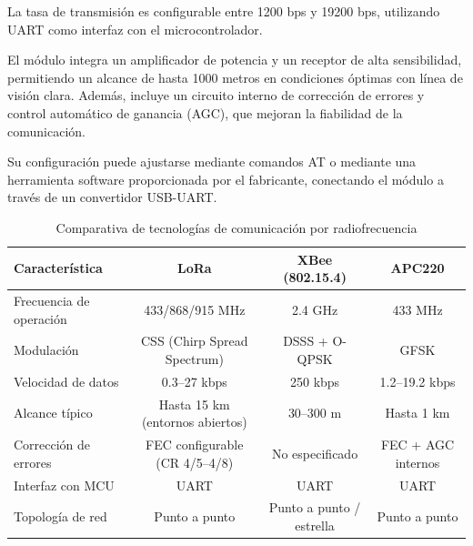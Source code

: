 \begin{itemize}
    La tasa de transmisión es configurable entre 1200 bps y 19200 bps, utilizando UART como interfaz con el microcontrolador.

    El módulo integra un amplificador de potencia y un receptor de alta sensibilidad, permitiendo un alcance de hasta 1000 metros en condiciones óptimas con línea de visión clara.
    Además, incluye un circuito interno de corrección de errores y control automático de ganancia (AGC), que mejoran la fiabilidad de la comunicación.

    Su configuración puede ajustarse mediante comandos AT o mediante una herramienta software proporcionada por el fabricante, conectando el módulo a través de un convertidor USB-UART.
\end{itemize}
\begin{table}[h]
    \centering
    \footnotesize
    \begin{tabular}{|l|c|c|c|}
        \hline
        \textbf{Característica} & \textbf{LoRa}                   & \textbf{XBee (802.15.4)} & \textbf{APC220}    \\
        \hline
        Frecuencia de operación & 433/868/915 MHz                 & 2.4 GHz                  & 433 MHz            \\
        \hline
        Modulación              & CSS (Chirp Spread Spectrum)     & DSSS + O-QPSK            & GFSK               \\
        \hline
        Velocidad de datos      & 0.3–27 kbps                     & 250 kbps                 & 1.2–19.2 kbps      \\
        \hline
        Alcance típico          & Hasta 15 km (entornos abiertos) & 30–300 m                 & Hasta 1 km         \\
        \hline
        Corrección de errores   & FEC configurable (CR 4/5–4/8)   & No especificado          & FEC + AGC internos \\
        \hline
        Interfaz con MCU        & UART                            & UART                     & UART               \\
        \hline
        Topología de red        & Punto a punto                   & Punto a punto / estrella & Punto a punto      \\
        \hline
    \end{tabular}
    \caption{Comparativa de tecnologías de comunicación por radiofrecuencia}
    \label{tab:comparativa_rf}
\end{table}


